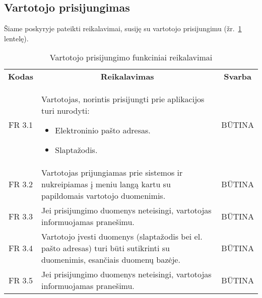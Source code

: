 \documentclass{VUMIFPSkursinis}
\begin{document}
\pagebreak

\subsection{Vartotojo prisijungimas}
Šiame poskyryje pateikti reikalavimai, susiję su vartotojo prisijungimu (žr.~\ref{table:VartotojoPrisijungimas} lentelę).

\begin{center}
	\begin{table}[H]
	\begin{tabular}{|p{2cm}|p{}|p{}|}
	\hline
	    \rowcolor{lightgray}
		\multicolumn{3}{|c|}{Vartotojo prisijungimas}\\
		
	\hline
		\multicolumn{1}{|c|}{{\bfseries Kodas}}&
		\multicolumn{1}{|c|}{{\bfseries Reikalavimas}}&
		\multicolumn{1}{|c|}{{\bfseries Svarba}}\\

	\hline
	
		\multicolumn{1}{|c|}{FR 3.1}&
		{Vartotojas, norintis prisijungti prie aplikacijos turi nurodyti:
			\begin{itemize}
				\item Elektroninio pašto adresas.
				\item Slaptažodis.
			\end{itemize}
		}&
		\multicolumn{1}{|c|}{BŪTINA}\\	
		
	\hline	
		\multicolumn{1}{|c|}{FR 3.2}&
		{Vartotojas prijungiamas prie sistemos ir nukreipiamas į meniu langą kartu su papildomais vartotojo duomenimis.}&
		\multicolumn{1}{|c|}{BŪTINA}\\
		
	\hline	
		\multicolumn{1}{|c|}{FR 3.3}&
		{Jei prisijungimo duomenys neteisingi, vartotojas informuojamas pranešimu.}&
		\multicolumn{1}{|c|}{BŪTINA}\\		
		
	\hline
		\multicolumn{1}{|c|}{FR 3.4}&
		{Vartotojo įvesti duomenys (slaptažodis bei el. pašto adresas) turi būti sutikrinti su duomenimis, esančiais duomenų bazėje.}&
		\multicolumn{1}{|c|}{BŪTINA}\\
		
	\hline	
		\multicolumn{1}{|c|}{FR 3.5}&
		{Jei prisijungimo duomenys neteisingi, vartotojas informuojamas pranešimu.}&
		\multicolumn{1}{|c|}{BŪTINA}\\
	\hline
	
	
	
	\end{tabular}	
	\caption{Vartotojo prisijungimo funkciniai reikalavimai}
	\label{table:VartotojoPrisijungimas}		
	\end{table}

\end{center}
\pagebreak
\end{document}
